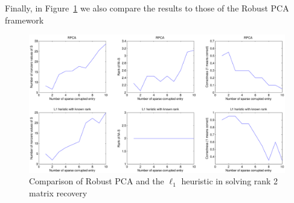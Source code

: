 Finally, in Figure~\ref{fig:rank2s} we also compare the results to those of the Robust PCA framework
%
\begin{figure}[h!]
\centering
\includegraphics[width=\textwidth]{../figures/comparisonwithrank2.pdf}
\caption{Comparison of Robust PCA and the $\ell_1$ heuristic in solving rank 2 matrix recovery}
\label{fig:rank2s}
\end{figure}


